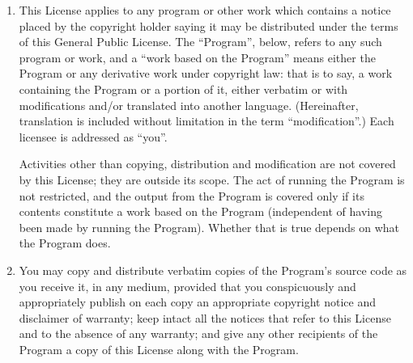 \begin{enumerate}
        \addtocounter{enumi}{-1}
    \item This License applies to any program or other work which contains a
        notice placed by the copyright holder saying it may be distributed
        under the terms of this General Public License.  The ``Program'',
        below, refers to any such program or work, and a ``work based on the
        Program'' means either the Program or any derivative work under
        copyright law: that is to say, a work containing the Program or a
        portion of it, either verbatim or with modifications and/or
        translated into another language. (Hereinafter, translation is
        included without limitation in the term ``modification''.) Each
        licensee is addressed as ``you''.

        Activities other than copying, distribution and modification are not
        covered by this License; they are outside its scope.  The act of
        running the Program is not restricted, and the output from the
        Program is covered only if its contents constitute a work based on
        the Program (independent of having been made by running the Program).
        Whether that is true depends on what the Program does.
    \item You may copy and distribute verbatim copies of the Program's source
        code as you receive it, in any medium, provided that you
        conspicuously and appropriately publish on each copy an appropriate
        copyright notice and disclaimer of warranty; keep intact all the
        notices that refer to this License and to the absence of any
        warranty; and give any other recipients of the Program a copy of this
        License along with the Program.


\end{enumerate}
